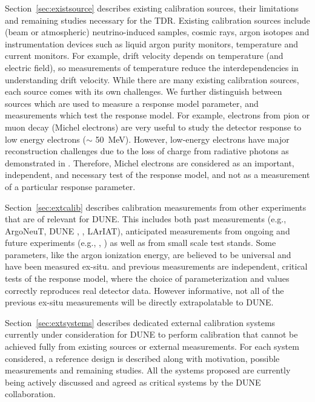 Section~\ref{sec:existsource} describes existing calibration sources, their limitations and remaining studies necessary for the TDR. Existing calibration sources include (beam or atmospheric)  neutrino-induced samples, cosmic rays, argon isotopes and instrumentation devices such as liquid argon purity monitors, temperature and current monitors. For example, drift velocity depends on  temperature (and electric field), so measurements of temperature reduce the interdependencies in understanding drift velocity. While there are many existing calibration sources, each source comes with its own challenges. We further distinguish between sources which are used to measure a response model parameter, and measurements which test the response model. For example, electrons from pion or muon decay (Michel electrons) are very useful to study the detector response to low energy electrons ($\sim$ \SI{50}{\MeV}). However, low-energy electrons have major reconstruction challenges due to the loss of charge from radiative photons as demonstrated in . Therefore, Michel electrons are considered as an important, independent, and necessary test of the response model, and not as a measurement of a particular response parameter.

Section~\ref{sec:extcalib} describes calibration measurements from 
other  experiments that are of relevant for DUNE. This includes both past measurements (e.g., ArgoNeuT, DUNE , , LArIAT), anticipated measurements from ongoing and future experiments (e.g., , ) as well as from small scale  test stands. Some parameters, like the argon ionization energy, are believed to be universal and have been measured ex-situ.  and previous measurements are independent, critical tests of the response model, where the choice of parameterization and values correctly reproduces real detector data. However informative, not all of the previous ex-situ measurements will be directly extrapolatable to DUNE.

Section~\ref{sec:extsystems} describes dedicated external calibration systems currently under consideration for DUNE to perform calibration that cannot be achieved fully from existing sources or external measurements. For each system considered, a reference design is described along with motivation, possible measurements and remaining studies. All the systems proposed are currently being actively discussed and agreed as critical systems by the DUNE collaboration.

